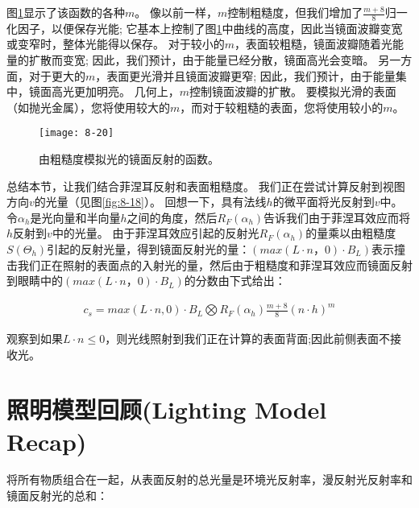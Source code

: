 \begin{flushleft}
图\ref{fig:8-20}显示了该函数的各种$m$。 像以前一样，$m$控制粗糙度，但我们增加了$\frac{m+8}{8}$归一化因子，以便保存光能; 它基本上控制了图\ref{fig:8-20}中曲线的高度，因此当镜面波瓣变宽或变窄时，整体光能得以保存。 对于较小的$m$，表面较粗糙，镜面波瓣随着光能量的扩散而变宽; 因此，我们预计，由于能量已经分散，镜面高光会变暗。 另一方面，对于更大的$m$，表面更光滑并且镜面波瓣更窄; 因此，我们预计，由于能量集中，镜面高光更加明亮。 几何上，$m$控制镜面波瓣的扩散。 要模拟光滑的表面（如抛光金属），您将使用较大的$m$，而对于较粗糙的表面，您将使用较小的$m$。
\end{flushleft}

\begin{figure}[h]
    \texttt{[image: 8-20]}
    \centering
    \caption{由粗糙度模拟光的镜面反射的函数。}
    \label{fig:8-20}
\end{figure}

\begin{flushleft}
总结本节，让我们结合菲涅耳反射和表面粗糙度。 我们正在尝试计算反射到视图方向$v$的光量（见图\ref{fig:8-18}）。 回想一下，具有法线$h$的微平面将光反射到$v$中。令$\alpha_{h}$是光向量和半向量$h$之间的角度，然后$R_{F}(\alpha_{h})$告诉我们由于菲涅耳效应而将$h$反射到$v$中的光量。 由于菲涅耳效应引起的反射光$R_{F}(\alpha_{h})$的量乘以由粗糙度$S(\Theta_{h})$引起的反射光量，得到镜面反射光的量：$(max(L\cdot n，0)\cdot B_{L})$表示撞击我们正在照射的表面点的入射光的量，然后由于粗糙度和菲涅耳效应而镜面反射到眼睛中的$(max(L\cdot n，0)\cdot B_{L})$的分数由下式给出：\\
\end{flushleft}

\begin{align*}\tag{eq.8.3}\label{eq.8.3}
c_{s}=max(L\cdot n, 0)\cdot B_{L}\bigotimes R_{F}(\alpha_{h})\frac{m+8}{8}(n\cdot h)^{m}
\end{align*}

\begin{flushleft}
观察到如果$L\cdot n\leq 0$，则光线照射到我们正在计算的表面背面;因此前侧表面不接收光。
\end{flushleft}

\section{照明模型回顾(Lighting Model Recap)}
\begin{flushleft}
将所有物质组合在一起，从表面反射的总光量是环境光反射率，漫反射光反射率和镜面反射光的总和：\\
\end{flushleft}

